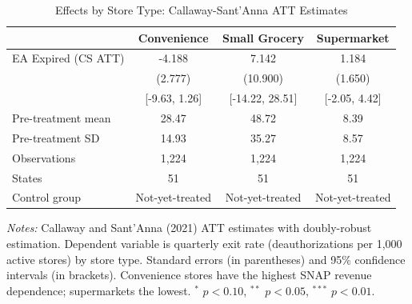 \begin{table}[htbp]
\centering
\caption{Effects by Store Type: Callaway-Sant'Anna ATT Estimates}
\label{tab:heterogeneity}
\begin{tabular}{lccc}
\toprule
 & Convenience & Small Grocery & Supermarket \\
\midrule
EA Expired (CS ATT) & -4.188 & 7.142 & 1.184 \\
 & (2.777) & (10.900) & (1.650) \\
 & [-9.63, 1.26] & [-14.22, 28.51] & [-2.05, 4.42] \\
\addlinespace
Pre-treatment mean & 28.47 & 48.72 & 8.39 \\
Pre-treatment SD & 14.93 & 35.27 & 8.57 \\
Observations & 1,224 & 1,224 & 1,224 \\
States & 51 & 51 & 51 \\
Control group & Not-yet-treated & Not-yet-treated & Not-yet-treated \\
\bottomrule
\end{tabular}
\begin{tablenotes}
\item \textit{Notes:} Callaway and Sant'Anna (2021) ATT estimates with doubly-robust estimation.
Dependent variable is quarterly exit rate (deauthorizations per 1,000 active stores) by store type.
Standard errors (in parentheses) and 95\% confidence intervals (in brackets).
Convenience stores have the highest SNAP revenue dependence; supermarkets the lowest.
$^{*}$ $p < 0.10$, $^{**}$ $p < 0.05$, $^{***}$ $p < 0.01$.
\end{tablenotes}
\end{table}
